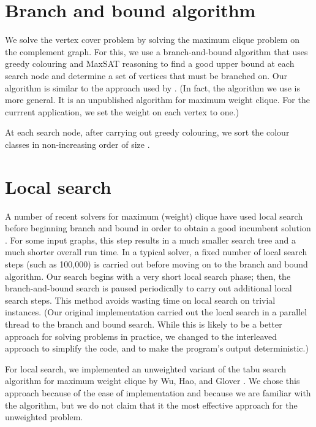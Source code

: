 \documentclass[a4paper,UKenglish,cleveref, autoref]{lipics-v2019}
\begin{document}
\section{Branch and bound algorithm}

We solve the vertex cover problem by solving the maximum clique problem on the complement graph.  For this, we use a branch-and-bound algorithm that uses greedy colouring and MaxSAT reasoning to find a good upper bound at each search node and determine a set of vertices that must be branched on.  Our algorithm is similar to the approach used by \cite{DBLP:conf/aaai/LiQ10}.  (In fact, the algorithm we use is more general.  It is an unpublished algorithm for maximum weight clique.  For the currrent application, we set the weight on each vertex to one.)

At each search node, after carrying out greedy colouring, we sort the colour classes in non-increasing order of size \cite{DBLP:conf/cp/2014}.

\section{Local search}

A number of recent solvers for maximum (weight) clique have used local search before beginning branch and bound in order to obtain a good incumbent solution \cite{DBLP:journals/jco/BatsynGMP14}.  For some input graphs, this step results in a much smaller search tree and a much shorter overall run time.  In a typical solver, a fixed number of local search steps (such as 100,000) is carried out before moving on to the branch and bound algorithm.  Our search begins with a very short local search phase; then, the branch-and-bound search is paused periodically to carry out additional local search steps.  This method avoids wasting time on local search on trivial instances.  (Our original implementation carried out the local search in a parallel thread to the branch and bound search.  While this is likely to be a better approach for solving problems in practice, we changed to the interleaved approach to simplify the code, and to make the program's output deterministic.)

For local search, we implemented an unweighted variant of the tabu search algorithm for maximum weight clique by Wu, Hao, and Glover \cite{DBLP:journals/anor/WuHG12}.  We chose this approach because of the ease of implementation and because we are familiar with the algorithm, but we do not claim that it the most effective approach for the unweighted problem.
\end{document}
